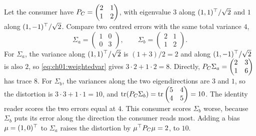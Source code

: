 \begin{example}\label{ex:ch01:trace}
Let the consumer have $P_C=\begin{pmatrix}2&1\\1&2\end{pmatrix}$, with
eigenvalue $3$ along $(1,1)^{\top}/\sqrt2$ and $1$ along $(1,-1)^{\top}/\sqrt2$. Compare
two centred errors with the same total variance $4$,
\[
\Sigma_a=\begin{pmatrix}1&0\\0&3\end{pmatrix},\qquad
\Sigma_b=\begin{pmatrix}2&1\\1&2\end{pmatrix}.
\]
For $\Sigma_a$, the variance along $(1,1)^{\top}/\sqrt2$ is $(1+3)/2=2$ and along
$(1,-1)^{\top}/\sqrt2$ is also $2$, so \cref{eq:ch01:weightedvar} gives
$3\cdot2+1\cdot2=8$. Directly, $P_C\Sigma_a=\begin{pmatrix}2&3\\1&6\end{pmatrix}$
has trace $8$. For $\Sigma_b$, the variances along the two eigendirections are
$3$ and $1$, so the distortion is $3\cdot3+1\cdot1=10$, and
$\operatorname{tr}(P_C\Sigma_b)=\operatorname{tr}\begin{pmatrix}5&4\\4&5\end{pmatrix}=10$. The identity
reader scores the two errors equal at $4$. This consumer scores $\Sigma_b$
worse, because $\Sigma_b$ puts its error along the direction the consumer reads
most. Adding a bias $\mu=(1,0)^{\top}$ to $\Sigma_a$ raises the distortion by
$\mu^{\top}P_C\mu=2$, to $10$.
\end{example}



